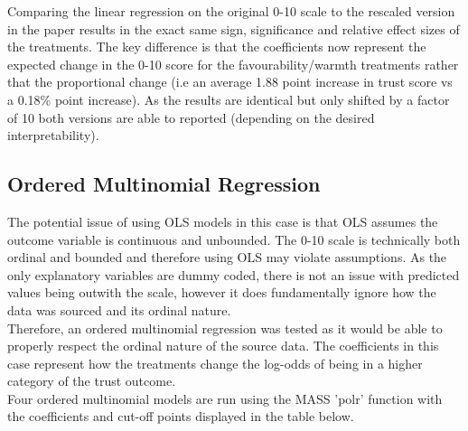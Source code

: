 \documentclass[12pt,letterpaper]{article}
\begin{document}
	Comparing the linear regression on the original 0-10 scale to the rescaled version in the paper results in the exact same sign, significance and relative effect sizes of the treatments. The key difference is that the coefficients now represent the expected change in the 0-10 score for the favourability/warmth treatments rather that the proportional change (i.e an average 1.88 point increase in trust score vs a 0.18\% point increase). 
	 As the results are identical but only shifted by a factor of 10 both versions are able to reported (depending on the desired interpretability). 

\vspace{1cm}
\subsection{Ordered Multinomial Regression}

	The potential issue of using OLS models in this case is that OLS assumes the outcome variable is continuous and unbounded. The 0-10 scale is technically both ordinal and bounded and therefore using OLS may violate assumptions. As the only explanatory variables are dummy coded, there is not an issue with predicted values being outwith the scale, however it does fundamentally ignore how the data was sourced and its ordinal nature. \\
	Therefore, an ordered multinomial regression was tested as it would be able to properly respect the ordinal nature of the source data. The coefficients in this case represent how the treatments change the log-odds of being in a higher category of the trust outcome.     \\

	Four ordered multinomial models are run using the MASS 'polr' function with the coefficients and cut-off points displayed in the table below. 
	
	
\end{document}
